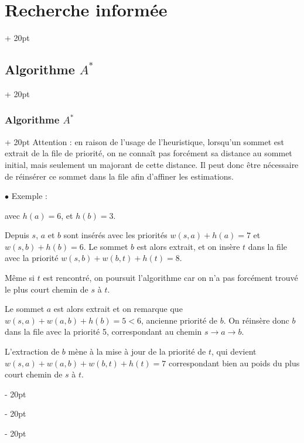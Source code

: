 \documentclass[a4paper, 12pt, twoside]{article}
\newcommand{\ind}[1][20pt]{\advance\leftskip + #1}
\newcommand{\deind}[1][20pt]{\advance\leftskip - #1}
\newenvironment{indt}[2][20pt]{#2 \par \ind[#1]}{\par \deind} %
\begin{document}
\begin{indt}{\section{Recherche informée}}
\begin{indt}{\subsection{Algorithme $A^*$}}
\begin{indt}{\subsubsection{Algorithme $A^*$}}
                Attention : en raison de l'usage de l'heuristique, lorsqu'un sommet est extrait de la file de priorité, on ne connaît pas forcément sa distance au sommet initial, mais seulement un majorant de cette distance.
                Il peut donc être nécessaire de réinsérer ce sommet dans la file afin d'affiner les estimations.

                \vspace{12pt}
                
                $\bullet$ Exemple :
                \begin{center}
                \end{center}

                avec $h(a) = 6$, et $h(b) = 3$.

                Depuis $s$, $a$ et $b$ sont insérés avec les priorités $w(s, a) + h(a) = 7$ et $w(s, b) + h(b) = 6$.
                Le sommet $b$ est alors extrait, et on insère $t$ dans la file avec la priorité $w(s, b) + w(b, t) + h(t) = 8$.

                Même si $t$ est rencontré, on poursuit l'algorithme car on n'a pas forcément trouvé le plus court chemin de $s$ à $t$.

                Le sommet $a$ est alors extrait et on remarque que $w(s, a) + w(a, b) + h(b) = 5 < 6$, ancienne priorité de $b$.
                On réinsère donc $b$ dans la file avec la priorité 5, correspondant au chemin $s \rightarrow a \rightarrow b$.

                L'extraction de $b$ mène à la mise à jour de la priorité de $t$, qui devient $w(s, a) + w(a, b) + w(b, t) + h(t) = 7$ correspondant bien au poids du plus court chemin de $s$ à $t$.

                \vspace{12pt}
                

\end{indt}
\end{indt}
\end{indt}
\end{document}
